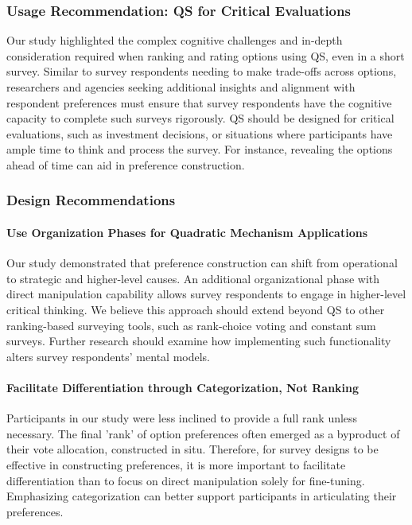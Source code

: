 \subsubsection{Usage Recommendation: QS for Critical Evaluations}
Our study highlighted the complex cognitive challenges and in-depth consideration required when ranking and rating options using QS, even in a short survey. Similar to survey respondents needing to make trade-offs across options, researchers and agencies seeking additional insights and alignment with respondent preferences must ensure that survey respondents have the cognitive capacity to complete such surveys rigorously. QS should be designed for critical evaluations, such as investment decisions, or situations where participants have ample time to think and process the survey. For instance, revealing the options ahead of time can aid in preference construction.

\subsubsection{Design Recommendations}
\paragraph{Use Organization Phases for Quadratic Mechanism Applications}
Our study demonstrated that preference construction can shift from operational to strategic and higher-level causes. An additional organizational phase with direct manipulation capability allows survey respondents to engage in higher-level critical thinking. We believe this approach should extend beyond QS to other ranking-based surveying tools, such as rank-choice voting and constant sum surveys. Further research should examine how implementing such functionality alters survey respondents' mental models.

\paragraph{Facilitate Differentiation through Categorization, Not Ranking}
Participants in our study were less inclined to provide a full rank unless necessary. The final 'rank' of option preferences often emerged as a byproduct of their vote allocation, constructed in situ. Therefore, for survey designs to be effective in constructing preferences, it is more important to facilitate differentiation than to focus on direct manipulation solely for fine-tuning. Emphasizing categorization can better support participants in articulating their preferences.

